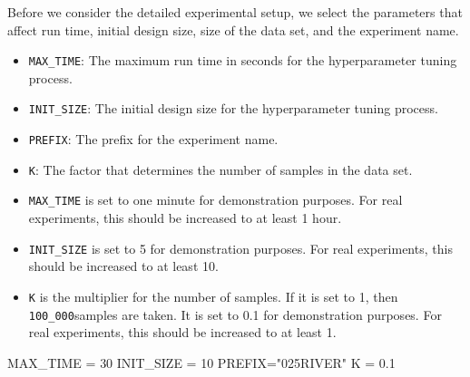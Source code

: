\documentclass[
  letterpaper,
  DIV=11,
  numbers=noendperiod]{scrreprt}
\newenvironment{Shaded}{\begin{snugshade}}{\end{snugshade}}
\newcommand{\DecValTok}[1]{\textcolor[rgb]{0.68,0.00,0.00}{#1}}
\newcommand{\FloatTok}[1]{\textcolor[rgb]{0.68,0.00,0.00}{#1}}
\newcommand{\NormalTok}[1]{\textcolor[rgb]{0.00,0.23,0.31}{#1}}
\newcommand{\OperatorTok}[1]{\textcolor[rgb]{0.37,0.37,0.37}{#1}}
\newcommand{\StringTok}[1]{\textcolor[rgb]{0.13,0.47,0.30}{#1}}
\providecommand{\tightlist}{%
  \setlength{\itemsep}{0pt}\setlength{\parskip}{0pt}}\usepackage{longtable,booktabs,array}
\begin{document}
Before we consider the detailed experimental setup, we select the
parameters that affect run time, initial design size, size of the data
set, and the experiment name.

\begin{itemize}
\tightlist
\item
  \texttt{MAX\_TIME}: The maximum run time in seconds for the
  hyperparameter tuning process.
\item
  \texttt{INIT\_SIZE}: The initial design size for the hyperparameter
  tuning process.
\item
  \texttt{PREFIX}: The prefix for the experiment name.
\item
  \texttt{K}: The factor that determines the number of samples in the
  data set.
\end{itemize}

\begin{tcolorbox}[enhanced jigsaw, rightrule=.15mm, coltitle=black, title=\textcolor{quarto-callout-caution-color}{\faFire}\hspace{0.5em}{Caution: Run time and initial design size should be increased for real
experiments}, opacitybacktitle=0.6, bottomrule=.15mm, opacityback=0, left=2mm, colback=white, leftrule=.75mm, colframe=quarto-callout-caution-color-frame, colbacktitle=quarto-callout-caution-color!10!white, toprule=.15mm, toptitle=1mm, bottomtitle=1mm, titlerule=0mm, breakable, arc=.35mm]

\begin{itemize}
\tightlist
\item
  \texttt{MAX\_TIME} is set to one minute for demonstration purposes.
  For real experiments, this should be increased to at least 1 hour.
\item
  \texttt{INIT\_SIZE} is set to 5 for demonstration purposes. For real
  experiments, this should be increased to at least 10.
\item
  \texttt{K} is the multiplier for the number of samples. If it is set
  to 1, then \texttt{100\_000}samples are taken. It is set to 0.1 for
  demonstration purposes. For real experiments, this should be increased
  to at least 1.
\end{itemize}

\end{tcolorbox}

\begin{Shaded}
\begin{Highlighting}[]
\NormalTok{MAX\_TIME }\OperatorTok{=} \DecValTok{30}
\NormalTok{INIT\_SIZE }\OperatorTok{=} \DecValTok{10}
\NormalTok{PREFIX}\OperatorTok{=}\StringTok{"025RIVER"}
\NormalTok{K }\OperatorTok{=} \FloatTok{0.1}
\end{Highlighting}
\end{Shaded}
\end{document}

